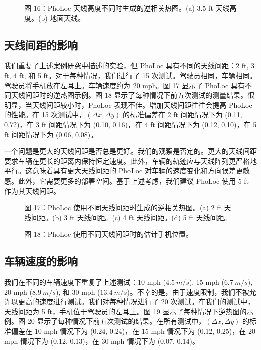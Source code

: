 \documentclass[journal, onecolumn]{IEEEtran}
\begin{document}
\begin{figure}[htbp]
\centering
\caption{图 16：PhoLoc 天线高度不同时生成的逆相关热图。(a) 3.5 ft 天线高度。(b) 地面天线。}
\label{fig:16}
\end{figure}

\subsection{天线间距的影响}
我们重复了上述案例研究中描述的实验，但 PhoLoc 具有不同的天线间距：2 ft, 3 ft, 4 ft, 和 5 ft。对于每种情况，我们进行了 15 次测试。驾驶员相同，车辆相同。驾驶员将手机放在左耳上。车辆速度约为 20 mph。图 17 显示了 PhoLoc 具有不同天线间距时的逆热图示例。图 18 显示了每种情况下前五次测试的测量结果。很明显，当天线间距较小时，PhoLoc 表现不佳。增加天线间距往往会提高 PhoLoc 的性能。在 15 次测试中，$(\Delta x,\Delta y)$ 的标准偏差在 2 ft 间距情况下为 (0.11, 0.72)，在 3 ft 间距情况下为 (0.10, 0.16)，在 4 ft 间距情况下为 (0.12, 0.10)，在 5 ft 间距情况下为 (0.06, 0.08)。

一个问题是更大的天线间距是否总是更好。我们的观察是否定的。更大的天线间距要求车辆在更长的距离内保持恒定速度。此外，车辆的轨迹应与天线阵列更严格地平行。这意味着具有更大天线间距的 PhoLoc 对车辆的速度变化和方向误差更敏感。此外，它需要更多的部署空间。基于上述考虑，我们建议 PhoLoc 使用 5 ft 作为其天线间距。

\begin{figure}[htbp]
\centering
\caption{图 17：PhoLoc 使用不同天线间距时生成的逆相关热图。(a) 2 ft 天线间距。(b) 3 ft 天线间距。(c) 4 ft 天线间距。(d) 5 ft 天线间距。}
\label{fig:17}
\end{figure}

\begin{figure}[htbp]
\centering
\caption{图 18：PhoLoc 使用不同天线间距时的估计手机位置。}
\label{fig:18}
\end{figure}

\subsection{车辆速度的影响}
我们在不同的车辆速度下重复了上述测试：10 mph ($4.5~m/s$), 15 mph ($6.7~m/s$), 20 mph ($8.9~m/s$), 和 30 mph ($13.4~m/s$)。不幸的是，由于速度限制，我们不被允许以更高的速度进行测试。我们对每种情况进行了 20 次测试。在我们的测试中，天线间距为 5 ft，手机位于驾驶员的左耳上。图 19 显示了每种情况下逆热图的示例。图 20 显示了每种情况下前五次测试的结果。在所有测试中，$(\Delta x,\Delta y)$ 的标准偏差在 10 mph 情况下为 (0.24, 0.24)，在 15 mph 情况下为 (0.12, 0.25)，在 20 mph 情况下为 (0.12, 0.13)，在 30 mph 情况下为 (0.07, 0.14)。
\end{document}
